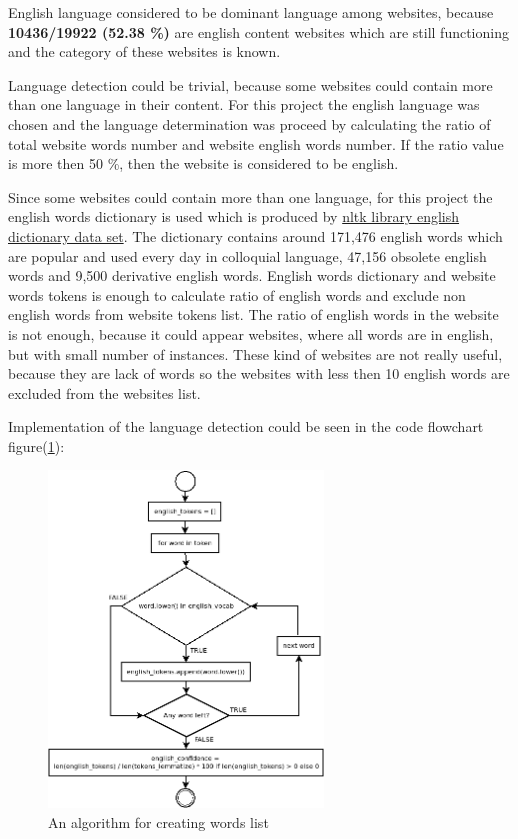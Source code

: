 English language considered to be dominant language among websites, because \textbf{10436/19922 (52.38 \%)} are english content websites which are still functioning and the category of these websites is known. 

Language detection could be trivial, because some websites could contain more than one language in their content. For this project the english language was chosen and the language determination was proceed by calculating the ratio of total website words number and website english words number. If the ratio value is more then 50 \%, then the website is considered to be english.


Since some websites could contain more than one language, for this project the english words dictionary is used which is produced by \href{https://www.nltk.org/book/ch01.html}{nltk library english dictionary data set}. The dictionary contains around 171,476 english words which are popular and used every day in colloquial language, 47,156 obsolete english words and 9,500 derivative english words. English words dictionary and website words tokens is enough to calculate ratio of english words and exclude non english words from website tokens list. 
The ratio of english words in the website is not enough, because it could appear websites, where all words are in english, but with small number of instances. These kind of websites are not really useful, because they are lack of words so the websites with less then 10 english words are excluded from the websites list.

Implementation of the language detection could be seen in the code flowchart figure(\ref{fig:detect_lang}):
\begin{figure}[H]
    \centering
    \includegraphics[width=0.65\textwidth]{Pictures/detect_lang.png}
    \caption{\label{fig:detect_lang}{} An algorithm for creating words list }
\end{figure}




